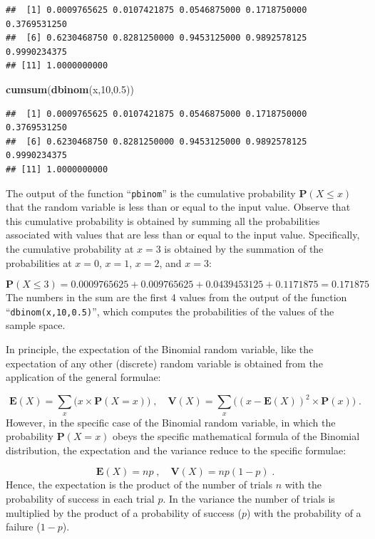 \documentclass[]{krantz}
\makeatletter
\newenvironment{Shaded}{\begin{snugshade}}{\end{snugshade}}
\newcommand{\DecValTok}[1]{\textcolor[rgb]{0.00,0.00,0.81}{#1}}
\newcommand{\FloatTok}[1]{\textcolor[rgb]{0.00,0.00,0.81}{#1}}
\newcommand{\KeywordTok}[1]{\textcolor[rgb]{0.13,0.29,0.53}{\textbf{#1}}}
\newcommand{\NormalTok}[1]{#1}
\newcommand{\Expec}{\mathbf{E}}
\newcommand{\Prob}{\mathbf{P}}
\newcommand{\Var}{\mathbf{V}}
\newenvironment{kframe}{%
\medskip{}
\setlength{\fboxsep}{.8em}
 \def\at@end@of@kframe{}%
 \ifinner\ifhmode%
  \def\at@end@of@kframe{\end{minipage}}%
  \begin{minipage}{\columnwidth}%
 \fi\fi%
 \def\FrameCommand##1{\hskip\@totalleftmargin \hskip-\fboxsep
 \colorbox{shadecolor}{##1}\hskip-\fboxsep
     \hskip-\linewidth \hskip-\@totalleftmargin \hskip\columnwidth}%
 \MakeFramed {\advance\hsize-\width
   \@totalleftmargin\z@ \linewidth\hsize
   \@setminipage}}%
 {\par\unskip\endMakeFramed%
 \at@end@of@kframe}
\renewenvironment{Shaded}{\begin{kframe}}{\end{kframe}}
\theoremstyle{definition}
\theoremstyle{definition}
\theoremstyle{definition}
\theoremstyle{remark}
\makeatother
\begin{document}
\begin{verbatim}
##  [1] 0.0009765625 0.0107421875 0.0546875000 0.1718750000 0.3769531250
##  [6] 0.6230468750 0.8281250000 0.9453125000 0.9892578125 0.9990234375
## [11] 1.0000000000
\end{verbatim}

\begin{Shaded}
\begin{Highlighting}[]
\KeywordTok{cumsum}\NormalTok{(}\KeywordTok{dbinom}\NormalTok{(x,}\DecValTok{10}\NormalTok{,}\FloatTok{0.5}\NormalTok{))}
\end{Highlighting}
\end{Shaded}

\begin{verbatim}
##  [1] 0.0009765625 0.0107421875 0.0546875000 0.1718750000 0.3769531250
##  [6] 0.6230468750 0.8281250000 0.9453125000 0.9892578125 0.9990234375
## [11] 1.0000000000
\end{verbatim}

The output of the function ``\texttt{pbinom}'' is the cumulative probability
\(\Prob(X \leq x)\) that the random variable is less than or equal to the
input value. Observe that this cumulative probability is obtained by
summing all the probabilities associated with values that are less than
or equal to the input value. Specifically, the cumulative probability at
\(x=3\) is obtained by the summation of the probabilities at \(x=0\), \(x=1\),
\(x=2\), and \(x=3\):

\[\Prob(X \leq 3) = 0.0009765625 + 0.009765625 + 0.0439453125 + 0.1171875 = 0.171875\]
The numbers in the sum are the first 4 values from the output of the
function ``\texttt{dbinom(x,10,0.5)}'', which computes the probabilities of the
values of the sample space.

In principle, the expectation of the Binomial random variable, like the
expectation of any other (discrete) random variable is obtained from the
application of the general formulae:

\[\Expec(X) = \sum_x \big(x \times \Prob(X = x)\big)\;,\quad \Var(X) = \sum_x\big( (x-\Expec(X))^2 \times \Prob(x)\big)\;.\]
However, in the specific case of the Binomial random variable, in which
the probability \(\Prob(X = x)\) obeys the specific mathematical formula
of the Binomial distribution, the expectation and the variance reduce to
the specific formulae:

\[\Expec(X) = n p\;,\quad \Var(X) = n p(1-p)\;.\]
Hence, the expectation is the product of the number of trials \(n\) with
the probability of success in each trial \(p\). In the variance the number
of trials is multiplied by the product of a probability of success (\(p\))
with the probability of a failure (\(1-p\)).
\end{document}
